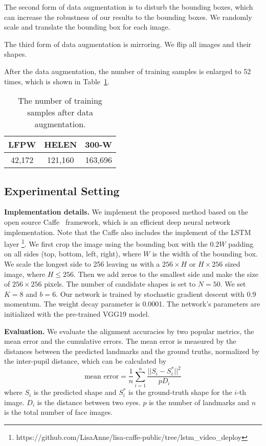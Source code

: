 \documentclass[journal]{IEEEtran}
\begin{document}
The second form of data augmentation is to disturb the bounding boxes, which can increase the robustness of our results to the bounding boxes. We randomly scale and translate the bounding box for each image.


The third form of data augmentation is mirroring. We flip all images and their shapes.

After the data augmentation, the number of training samples is enlarged to 52 times, which is shown in Table~\ref{number_training}.

\begin{table}[h]
\small
    \centering \caption{The number of training samples after data augmentation.}
    \begin{tabular}{|c|c|c|}
         \hline
          LFPW & HELEN & 300-W \\
        \hline
           42,172 & 121,160  & 163,696\\
         \hline
        \end{tabular}
        \label{number_training}
\end{table}

\subsection{Experimental Setting}

\textbf{Implementation details.} We implement the proposed method based on the open source Caffe~\cite{jia2013caffe} framework, which is an efficient deep neural network implementation. Note that the Caffe also includes the implement of the LSTM layer \footnote{https://github.com/LisaAnne/lisa-caffe-public/tree/lstm\_video\_deploy}. We first crop the image using the bounding box with the  $0.2 W$ padding on all sides (top, bottom, left, right), where $W$ is the width of the bounding box. We scale the longest side to 256 leaving us with a $256 \times H$ or $H \times 256$ sized image, where $H \leq 256$. Then we add zeros to the smallest side and make the size of $256 \times 256$ pixels. The number of candidate shapes is set to $N=50$. We set $K=8$ and $b = 6$. Our network is trained by stochastic gradient descent with 0.9 momentum. The weight decay parameter is 0.0001. The network's parameters are initialized with the pre-trained VGG19 model.

\textbf{Evaluation.}
We evaluate the alignment accuracies by two popular metrics, the mean error and the cumulative errors.
The mean error is measured by the distances between the predicted landmarks and the ground truths, normalized by the inter-pupil distance,
 which can be calculated by
\begin{equation}
\text{mean \ error} = \frac{1}{n} \sum_{i=1}^n \frac{ ||S_i - S^{*}_i||^2}{pD_i}
\end{equation}
where $S_i$ is the predicted shape and $S_i^{*}$ is the ground-truth shape for the $i$-th image. $D_i$ is the distance between two eyes. $p$ is the number of landmarks and $n$ is the total number of face images.
\end{document}
